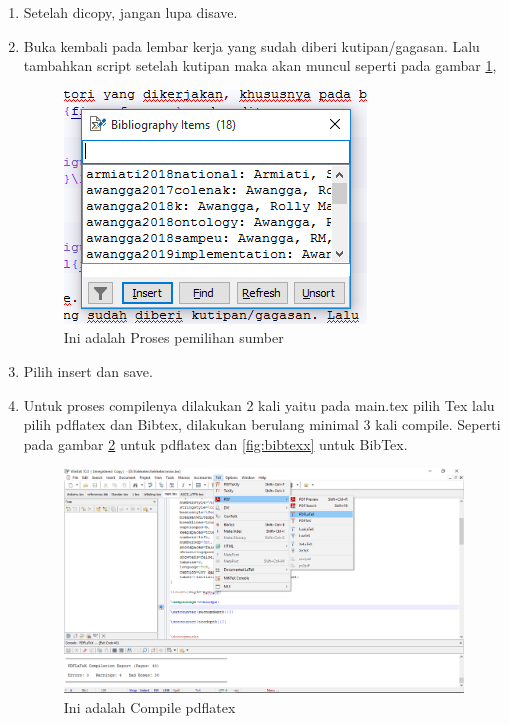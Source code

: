 \begin{enumerate}
\begin{figure}[!htbp]
\end{figure}
  \item Setelah dicopy, jangan lupa disave.
  \item Buka kembali pada lembar kerja yang sudah diberi kutipan/gagasan. Lalu tambahkan script setelah kutipan maka akan muncul seperti pada gambar \ref{fig:memilihsumber},

  \begin{figure}[!htbp]
  \centering
  \includegraphics[width=.75\textwidth]{figures/memilihsumber.png}
  \caption{Ini adalah Proses pemilihan sumber}\label{fig:memilihsumber}
\end{figure}
  \item Pilih insert dan save.
  \item Untuk proses compilenya dilakukan 2 kali yaitu pada main.tex pilih Tex lalu pilih pdflatex dan Bibtex, dilakukan berulang minimal 3 kali compile. Seperti pada gambar \ref{fig:pdflatex} untuk pdflatex dan \ref{fig:bibtexx} untuk BibTex.
   \begin{figure}[!htbp]
  \centering
  \includegraphics[width=.75\textwidth]{figures/pdflatex.png}
  \caption{Ini adalah Compile pdflatex}\label{fig:pdflatex}
\end{figure}

\end{enumerate}
